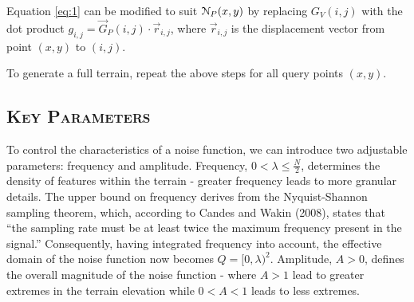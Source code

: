 Equation \ref{eq:1} can be modified to suit $\EuScript{N}_P(x,y)$ by replacing $G_V(i,j)$ with the
dot product $g_{i,j}=\vec{G}_P(i,j)\cdot \vec{r}_{i,j}$, where $\vec{r}_{i,j}$ is the displacement vector from
point $(x,y)$ to $(i,j)$.

To generate a full terrain, repeat the above steps for all query points $(x,y)$. 

\subsection{\textsc{Key Parameters}}
\vspace*{-10pt}

To control the characteristics of a noise function, we can introduce two adjustable parameters: frequency and 
amplitude. Frequency, $0<\lambda\le\frac{N}{2}$, determines the density of features within the terrain - greater 
frequency leads to more granular details. The upper bound on frequency derives from the Nyquist-Shannon sampling 
theorem, which, according to Candes and Wakin (2008), states that “the sampling rate must be at least twice the 
maximum frequency present in the signal.” Consequently, having integrated frequency into account, the effective 
domain of the noise function now becomes $Q=[0,\lambda)^2$. Amplitude, $A>0$, defines the overall magnitude of the
noise function - where $A>1$ lead to greater extremes in the terrain elevation while $0<A<1$ leads to less extremes.

